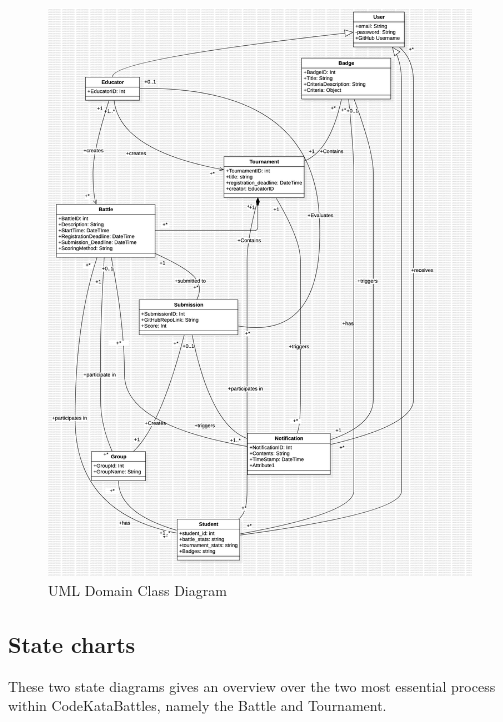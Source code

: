 \begin{figure}[htbp!]
    \centering
    \includegraphics[width=\textwidth]{Graphics/Main.png}
    \caption{UML Domain Class Diagram}
    \label{fig:ClassDiagram}
\end{figure}


\subsection{State charts}

These two state diagrams gives an overview over the two most essential process within CodeKataBattles, namely the Battle and Tournament. 

